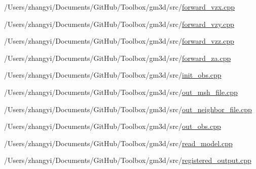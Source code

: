 \begin{DoxyCompactItemize}
/\+Users/zhangyi/\+Documents/\+Git\+Hub/\+Toolbox/gm3d/src/\mbox{\hyperlink{forward__vzx_8cpp}{forward\+\_\+vzx.\+cpp}}\item 
/\+Users/zhangyi/\+Documents/\+Git\+Hub/\+Toolbox/gm3d/src/\mbox{\hyperlink{forward__vzy_8cpp}{forward\+\_\+vzy.\+cpp}}\item 
/\+Users/zhangyi/\+Documents/\+Git\+Hub/\+Toolbox/gm3d/src/\mbox{\hyperlink{forward__vzz_8cpp}{forward\+\_\+vzz.\+cpp}}\item 
/\+Users/zhangyi/\+Documents/\+Git\+Hub/\+Toolbox/gm3d/src/\mbox{\hyperlink{forward__za_8cpp}{forward\+\_\+za.\+cpp}}\item 
/\+Users/zhangyi/\+Documents/\+Git\+Hub/\+Toolbox/gm3d/src/\mbox{\hyperlink{init__obs_8cpp}{init\+\_\+obs.\+cpp}}\item 
/\+Users/zhangyi/\+Documents/\+Git\+Hub/\+Toolbox/gm3d/src/\mbox{\hyperlink{out__msh__file_8cpp}{out\+\_\+msh\+\_\+file.\+cpp}}\item 
/\+Users/zhangyi/\+Documents/\+Git\+Hub/\+Toolbox/gm3d/src/\mbox{\hyperlink{out__neighbor__file_8cpp}{out\+\_\+neighbor\+\_\+file.\+cpp}}\item 
/\+Users/zhangyi/\+Documents/\+Git\+Hub/\+Toolbox/gm3d/src/\mbox{\hyperlink{out__obs_8cpp}{out\+\_\+obs.\+cpp}}\item 
/\+Users/zhangyi/\+Documents/\+Git\+Hub/\+Toolbox/gm3d/src/\mbox{\hyperlink{read__model_8cpp}{read\+\_\+model.\+cpp}}\item 
/\+Users/zhangyi/\+Documents/\+Git\+Hub/\+Toolbox/gm3d/src/\mbox{\hyperlink{registered__output_8cpp}{registered\+\_\+output.\+cpp}}\end{DoxyCompactItemize}
